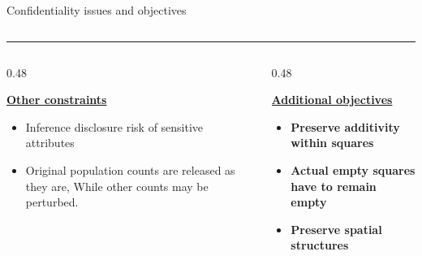 \documentclass[final,xcolor={dvipsnames,svgnames,table}]{beamer}
\newlength{\colwidth}
\begin{document}
\begin{frame}[fragile,t]
\begin{columns}[t]
\begin{column}{\colwidth}
\begin{backblock}{Confidentiality issues and objectives}
\begin{itemize}
\begin{columns}[t]
      \end{columns}

    \end{itemize}

      \hrule 

      \vspace{0.25cm}
      
      \begin{columns}[t]
      
          \begin{column}{0.48\colwidth}
          
            \underline{\textbf{Other constraints}}
            \normalsize
            \begin{itemize}
              \item Inference disclosure risk of sensitive attributes
              \item Original population counts are released as they are, While other counts may be perturbed.
            \end{itemize}
              
          \end{column}
          
        \hfill
          
        \begin{column}{0.48\colwidth}
            
            \underline{\textbf{Additional objectives}}
            \normalsize          
            \begin{itemize}
              \item \textbf{Preserve additivity within squares}
              \item \textbf{Actual empty squares have to remain empty}
              \item \textbf{Preserve spatial structures}
            \end{itemize} 
            
        \end{column}

      \end{columns}
      

\end{backblock}
\end{column}
\end{columns}
\end{frame}
\end{document}
